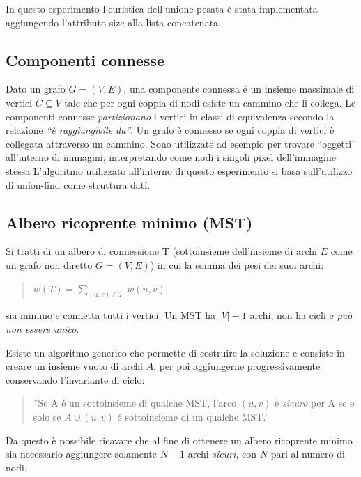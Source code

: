 \documentclass[
]{article}
\begin{document}
In questo esperimento l'euristica dell'unione pesata è stata
implementata aggiungendo l'attributo size alla lista concatenata.

\hypertarget{componenti-connesse}{%
\subsection{Componenti connesse}\label{componenti-connesse}}

Dato un grafo \(G=(V,E)\), una componente connessa é un insieme
massimale di vertici \(C \subseteq V\) tale che per ogni coppia di nodi esiste un
cammino che li collega. Le componenti connesse \emph{partizionano} i
vertici in classi di equivalenza secondo la relazione \emph{``è
raggiungibile da''}. Un grafo è connesso se ogni coppia di vertici è
collegata attraverso un cammino. Sono utilizzate ad esempio per trovare
``oggetti'' all'interno di immagini, interpretando come nodi i singoli
pixel dell'immagine stessa L'algoritmo utilizzato all'interno di questo
esperimento si basa sull'utilizzo di union-find come struttura dati.

\hypertarget{albero-ricoprente-minimo-mst}{%
\subsection{Albero ricoprente minimo
(MST)}\label{albero-ricoprente-minimo-mst}}

Si tratti di un albero di connessione T (sottoinsieme dell'insieme di
archi \(E\) come un grafo non diretto \(G=(V,E)\)) in cui la somma dei
pesi dei suoi archi:

\begin{quote}
	\centering
\displaystyle  \(w(T) = \sum_{(u,v) \in T} \ w(u, v)\)
\end{quote}

sia minimo e connetta tutti i vertici. Un MST ha \(|V|-1\) archi, non ha
cicli e \emph{può non essere unico}.

Esiste un algoritmo generico che permette di costruire la soluzione e
consiste in creare un insieme vuoto di archi \(A\), per poi aggiungerne
progressivamente conservando l'invariante di ciclo:

\begin{quote}
''Se A é un sottoinsieme di qualche MST, l'arco \((u,v)\) é
\emph{sicuro} per A se e solo se \(A \cup (u,v)\) é sottoinsieme di un
qualche MST.''
\end{quote}

Da questo è possibile ricavare che al fine di ottenere un albero
ricoprente minimo sia necessario aggiungere solamente \(N-1\) archi
\emph{sicuri}, con \(N\) pari al numero di nodi.
\end{document}
